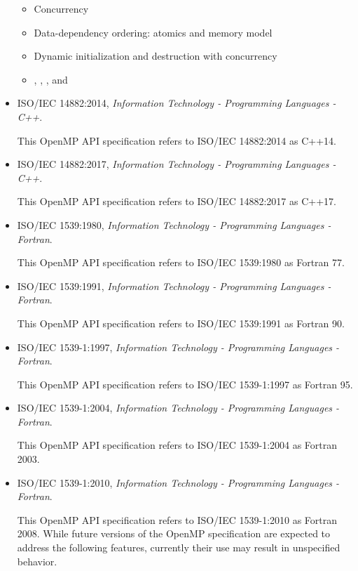 \begin{itemize}
\begin{itemize}
\item Concurrency
\item Data-dependency ordering: atomics and memory model
\item Dynamic initialization and destruction with concurrency
\item {}, , ,
   and 
\end{itemize}

\item ISO/IEC 14882:2014, \textsl{Information Technology - Programming Languages - C++}.

This OpenMP API specification refers to ISO/IEC 14882:2014 as C++14. 

\item ISO/IEC 14882:2017, \textsl{Information Technology - Programming Languages - C++}.

This OpenMP API specification refers to ISO/IEC 14882:2017 as
C++17. 

\item ISO/IEC 1539:1980, \textsl{Information Technology - Programming Languages - Fortran}.

This OpenMP API specification refers to ISO/IEC 1539:1980 as Fortran 77.

\item ISO/IEC 1539:1991, \textsl{Information Technology - Programming Languages - Fortran}.

This OpenMP API specification refers to ISO/IEC 1539:1991 as Fortran 90.

\item ISO/IEC 1539-1:1997, \textsl{Information Technology - Programming Languages - Fortran}.

This OpenMP API specification refers to ISO/IEC 1539-1:1997 as Fortran 95.

\item ISO/IEC 1539-1:2004, \textsl{Information Technology - Programming Languages - Fortran}.

This OpenMP API specification refers to ISO/IEC 1539-1:2004 as Fortran 2003.

\item ISO/IEC 1539-1:2010, \textsl{Information Technology - Programming Languages - Fortran}.

This OpenMP API specification refers to ISO/IEC 1539-1:2010 as Fortran 2008. 
While future versions of the OpenMP specification are expected to
address the following features, currently their use may result in
unspecified behavior.


\end{itemize}
